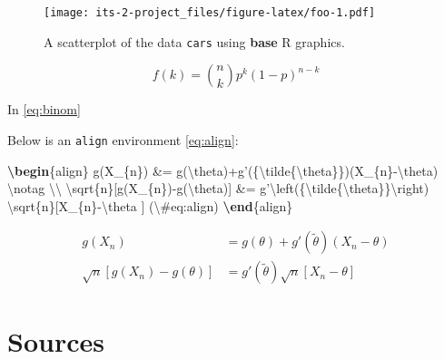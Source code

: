 \documentclass[]{book}
\newenvironment{Shaded}{\begin{snugshade}}{\end{snugshade}}
\newcommand{\ExtensionTok}[1]{#1}
\newcommand{\KeywordTok}[1]{\textcolor[rgb]{0.13,0.29,0.53}{\textbf{#1}}}
\newcommand{\NormalTok}[1]{#1}
\newcommand{\SpecialCharTok}[1]{\textcolor[rgb]{0.00,0.00,0.00}{#1}}
\newcommand{\SpecialStringTok}[1]{\textcolor[rgb]{0.31,0.60,0.02}{#1}}
\theoremstyle{definition}
\theoremstyle{definition}
\theoremstyle{definition}
\theoremstyle{remark}
\begin{document}
\begin{figure}
\centering
\texttt{[image: its-2-project\_files/figure-latex/foo-1.pdf]}
\caption{\label{fig:foo}A scatterplot of the data \texttt{cars} using \textbf{base} R
graphics.}
\end{figure}

\begin{equation}
f\left(k\right)=\binom{n}{k}p^k\left(1-p\right)^{n-k} \label{eq:binom}
\end{equation}

In \eqref{eq:binom}

Below is an \texttt{align} environment \eqref{eq:align}:

\begin{Shaded}
\begin{Highlighting}[]
\KeywordTok{\textbackslash{}begin}\NormalTok{\{}\ExtensionTok{align}\NormalTok{\}}\SpecialStringTok{ }
\SpecialStringTok{g(X_\{n\}) &= g(}\SpecialCharTok{\textbackslash{}theta}\SpecialStringTok{)+g'(\{}\SpecialCharTok{\textbackslash{}tilde}\SpecialStringTok{\{}\SpecialCharTok{\textbackslash{}theta}\SpecialStringTok{\}\})(X_\{n\}-}\SpecialCharTok{\textbackslash{}theta}\SpecialStringTok{) }\SpecialCharTok{\textbackslash{}notag}\SpecialStringTok{ }\SpecialCharTok{\textbackslash{}\textbackslash{}}
\SpecialCharTok{\textbackslash{}sqrt}\SpecialStringTok{\{n\}[g(X_\{n\})-g(}\SpecialCharTok{\textbackslash{}theta}\SpecialStringTok{)] &= g'}\SpecialCharTok{\textbackslash{}left}\SpecialStringTok{(\{}\SpecialCharTok{\textbackslash{}tilde}\SpecialStringTok{\{}\SpecialCharTok{\textbackslash{}theta}\SpecialStringTok{\}\}}\SpecialCharTok{\textbackslash{}right}\SpecialStringTok{)}
\SpecialStringTok{  }\SpecialCharTok{\textbackslash{}sqrt}\SpecialStringTok{\{n\}[X_\{n\}-}\SpecialCharTok{\textbackslash{}theta}\SpecialStringTok{ ] (}\SpecialCharTok{\textbackslash{}#}\SpecialStringTok{eq:align)}
\KeywordTok{\textbackslash{}end}\NormalTok{\{}\ExtensionTok{align}\NormalTok{\} }
\end{Highlighting}
\end{Shaded}

\begin{align}
g(X_{n}) &= g(\theta)+g'({\tilde{\theta}})(X_{n}-\theta)\\
\sqrt{n}[g(X_{n})-g(\theta)] &= g'\left({\tilde{\theta}}\right)
  \sqrt{n}[X_{n}-\theta ] \label{eq:align}
\end{align}

\hypertarget{sources-2}{%
\section*{Sources}\label{sources-2}}
\end{document}
